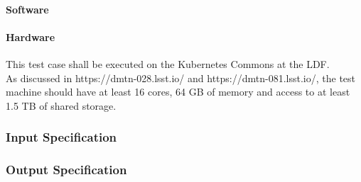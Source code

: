 \paragraph{Software}

\paragraph{Hardware}
This test case shall be executed on the Kubernetes Commons at the LDF.\\
As discussed in https://dmtn-028.lsst.io/ and https://dmtn-081.lsst.io/,
the test machine should have at least 16 cores, 64 GB of memory and
access to at least 1.5 TB of shared storage.


\subsubsection{Input Specification}

\subsubsection{Output Specification}

